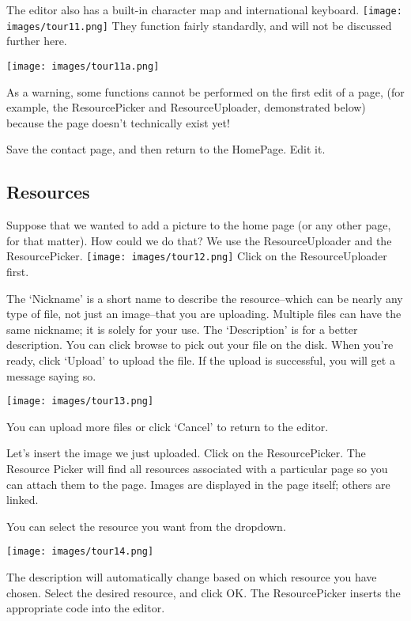 \documentclass[12pt]{article}
\begin{document}
The editor also has a built-in character map and international keyboard. \texttt{[image: images/tour11.png]}  They function fairly standardly, and will not be discussed further here.

\texttt{[image: images/tour11a.png]} 

As a warning, some functions cannot be performed on the first edit of a page, (for example, the ResourcePicker and ResourceUploader, demonstrated below) because the page doesn't technically exist yet!

Save the contact page, and then return to the HomePage. Edit it.

\subsection*{Resources}

Suppose that we wanted to add a picture to the home page (or any other page, for that matter). How could we do that? We use the ResourceUploader and the ResourcePicker. \texttt{[image: images/tour12.png]}  Click on the ResourceUploader first.

The `Nickname' is a short name to describe the resource--which can be nearly any type of file, not just an image--that you are uploading. Multiple files can have the same nickname; it is solely for your use. The `Description' is for a better description. You can click browse to pick out your file on the disk. When you're ready, click `Upload' to upload the file. If the upload is successful, you will get a message saying so.

\texttt{[image: images/tour13.png]} 

You can upload more files or click `Cancel' to return to the editor.

Let's insert the image we just uploaded. Click on the ResourcePicker. The Resource Picker will find all resources associated with a particular page so you can attach them to the page. Images are displayed in the page itself; others are linked.

You can select the resource you want from the dropdown.

\texttt{[image: images/tour14.png]} 

The description will automatically change based on which resource you have chosen. Select the desired resource, and click OK. The ResourcePicker inserts the appropriate code into the editor.
\end{document}
